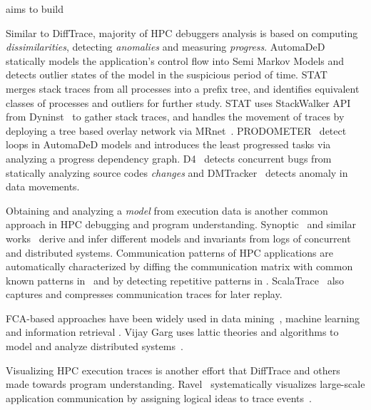 

aims to build

Similar to DiffTrace, majority of HPC debuggers analysis is based on computing  \textit{dissimilarities}, detecting \textit{anomalies} and measuring \textit{progress}.
%
AutomaDeD~\cite{automaded-GBron}\cite{automaded-laguna} statically models the application's control flow into Semi Markov Models and detects outlier states of the model in the suspicious period of time.
%
STAT~\cite{stat} merges stack traces from all processes into a prefix tree, and identifies equivalent classes of processes and outliers for further study.
%
STAT uses StackWalker API from Dyninst~\cite{dyninst} to gather stack traces, and handles the movement of traces by deploying a tree based overlay network via MRnet~\cite{mrnet}.
%
PRODOMETER~\cite{prodometer} detect loops in AutomaDeD models and introduces the least progressed tasks via analyzing a progress dependency graph.
%
D4~\cite{liu-18} detects concurrent bugs from statically analyzing source codes \textit{changes} and DMTracker~\cite{dmtracker} detects anomaly in data movements.

Obtaining and analyzing a \textit{model} from execution data is another common approach in HPC debugging and program understanding. 
Synoptic~\cite{beschastnikh-synoptic} and similar works~\cite{beschastnikh-pologs}\cite{beschastnikh-csight} derive and infer different models and invariants from logs of concurrent and distributed systems.
%
Communication patterns of HPC applications are automatically characterized by diffing the communication matrix with common known patterns in~\cite{roth-15} and by detecting repetitive patterns in \cite{preissl-08}.
%
ScalaTrace~\cite{scalatrace} also captures and compresses communication traces for later replay. 
%

FCA-based approaches have been widely used  in data mining~\cite{cldm}, machine learning~\cite{clml} and information retrieval \cite{ignatov17}. Vijay Garg uses lattic theories and algorithms to model and analyze distributed systems~\cite{latticeForDistConst}\cite{garg_2015}.

Visualizing HPC execution traces is another effort that DiffTrace and others made towards program understanding. Ravel~\cite{ravel} systematically visualizes large-scale application communication by assigning logical ideas to trace events~\cite{charmVis}. 







